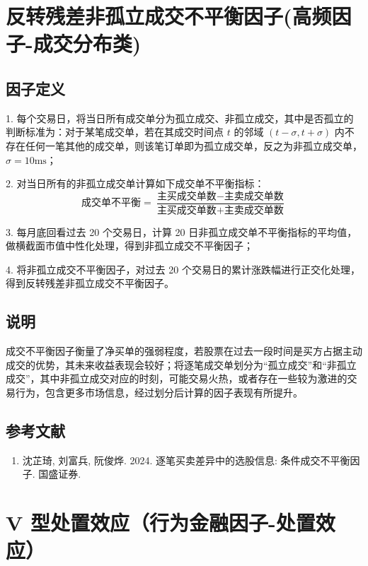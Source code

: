 \documentclass{article}
\begin{document}
\section{反转残差非孤立成交不平衡因子(高频因子-成交分布类)}

\subsection{因子定义}

1. 每个交易日，将当日所有成交单分为孤立成交、非孤立成交，其中是否孤立的判断标准为：对于某笔成交单，若在其成交时间点 \( t \) 的邻域 \((t - \sigma, t + \sigma)\) 内不存在任何一笔其他的成交单，则该笔订单即为孤立成交单，反之为非孤立成交单，\(\sigma = 10\mathrm{ms}\)；

2. 对当日所有的非孤立成交单计算如下成交单不平衡指标：
\begin{equation}
    \text{成交单不平衡} = \frac{\text{主买成交单数} - \text{主卖成交单数}}{\text{主买成交单数} + \text{主卖成交单数}}
\end{equation}

3. 每月底回看过去 20 个交易日，计算 20 日非孤立成交单不平衡指标的平均值，做横截面市值中性化处理，得到非孤立成交不平衡因子；

4. 将非孤立成交不平衡因子，对过去 20 个交易日的累计涨跌幅进行正交化处理，得到反转残差非孤立成交不平衡因子。

\subsection{说明}
成交不平衡因子衡量了净买单的强弱程度，若股票在过去一段时间是买方占据主动成交的优势，其未来收益表现会较好；将逐笔成交单划分为“孤立成交”和“非孤立成交”，其中非孤立成交对应的时刻，可能交易火热，或者存在一些较为激进的交易行为，包含更多市场信息，经过划分后计算的因子表现有所提升。

\subsection{参考文献}
\begin{enumerate}
    \item 沈芷琦, 刘富兵, 阮俊烨. 2024. 逐笔买卖差异中的选股信息: 条件成交不平衡因子. 国盛证券.
\end{enumerate}

\section{V 型处置效应（行为金融因子-处置效应）}
\end{document}
